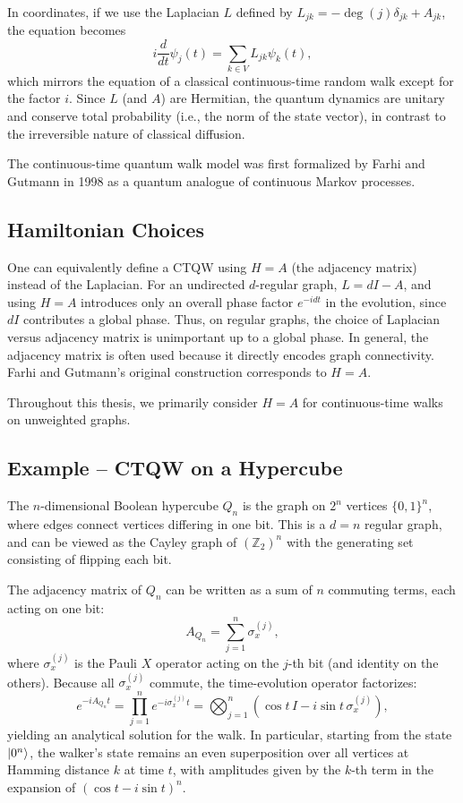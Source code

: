 \documentclass[12pt]{report}
\begin{document}
In coordinates, if we use the Laplacian $L$ defined by $L_{jk} = -\deg(j)\delta_{jk} + A_{jk}$, the equation becomes
\[
i \frac{d}{dt} \psi_j(t) = \sum_{k \in V} L_{jk} \psi_k(t),
\]
which mirrors the equation of a classical continuous-time random walk except for the factor $i$. Since $L$ (and $A$) are Hermitian, the quantum dynamics are unitary and conserve total probability (i.e., the norm of the state vector), in contrast to the irreversible nature of classical diffusion.

The continuous-time quantum walk model was first formalized by Farhi and Gutmann in 1998 as a quantum analogue of continuous Markov processes.

\subsection{Hamiltonian Choices}

One can equivalently define a CTQW using $H = A$ (the adjacency matrix) instead of the Laplacian. For an undirected $d$-regular graph, $L = dI - A$, and using $H=A$ introduces only an overall phase factor $e^{-i d t}$ in the evolution, since $dI$ contributes a global phase. Thus, on regular graphs, the choice of Laplacian versus adjacency matrix is unimportant up to a global phase. In general, the adjacency matrix is often used because it directly encodes graph connectivity. Farhi and Gutmann’s original construction corresponds to $H=A$.

Throughout this thesis, we primarily consider $H = A$ for continuous-time walks on unweighted graphs.

\subsection{Example – CTQW on a Hypercube}

The $n$-dimensional Boolean hypercube $Q_n$ is the graph on $2^n$ vertices $\{0,1\}^n$, where edges connect vertices differing in one bit. This is a $d = n$ regular graph, and can be viewed as the Cayley graph of $(\mathbb{Z}_2)^n$ with the generating set consisting of flipping each bit.

The adjacency matrix of $Q_n$ can be written as a sum of $n$ commuting terms, each acting on one bit:
\[
A_{Q_n} = \sum_{j=1}^{n} \sigma_x^{(j)},
\]
where $\sigma_x^{(j)}$ is the Pauli $X$ operator acting on the $j$-th bit (and identity on the others). Because all $\sigma_x^{(j)}$ commute, the time-evolution operator factorizes:
\[
e^{-i A_{Q_n} t} = \prod_{j=1}^{n} e^{-i \sigma_x^{(j)} t} = \bigotimes_{j=1}^{n} \left( \cos t \, I - i \sin t \, \sigma_x^{(j)} \right),
\]
yielding an analytical solution for the walk. In particular, starting from the state $\lvert0^n\rangle$, the walker's state remains an even superposition over all vertices at Hamming distance $k$ at time $t$, with amplitudes given by the $k$-th term in the expansion of $(\cos t - i \sin t)^n$.
\end{document}
